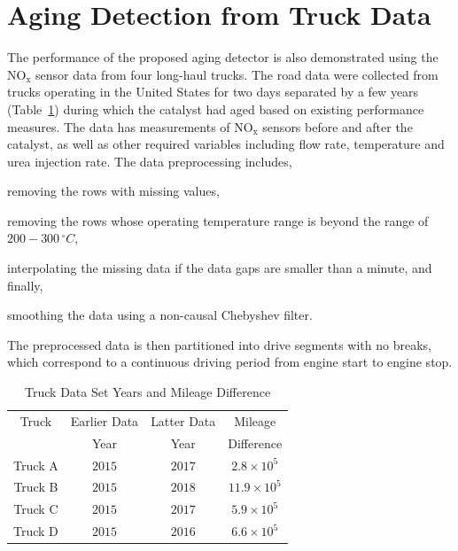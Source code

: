 \documentclass[subscriptcorrection,upint,varvw,barcolor=Goldenrod3,mathalfa=cal=euler,balance,hyphenate,french,pdf-a]{asmejour}
\newcommand{\nox}{\text{NO}_{\text{x}}}
\begin{document}
\section{Aging Detection from Truck Data}
The performance of the proposed aging detector is also demonstrated using the $\nox$ sensor data from four long-haul
trucks. The road data were collected from trucks operating in the United States for two days separated by a few years
(Table~\ref{tab::truck_data_summary}) during which the catalyst had aged based on existing performance measures. The
data has measurements of $\nox$ sensors before and after the catalyst, as well as other required variables
including flow rate, temperature and urea injection rate. The data preprocessing includes,
\begin{inparaenum}
        \item removing the rows with missing values,
        \item removing the rows whose operating temperature range is beyond the range of $200-300 \,^\circ C$,
        \item interpolating the missing data if the data gaps are smaller than a minute, and finally,
        \item smoothing the data using a non-causal Chebyshev filter.
\end{inparaenum}
The preprocessed data is then partitioned into drive segments with no breaks, which correspond to a continuous driving
period from engine start to engine stop.
\begin{table}[ht]
        \centering
        \caption{Truck Data Set Years and Mileage Difference}
        \label{tab::truck_data_summary}
        \begin{tabular}{c c c c}
                \hline \hline
                Truck   & Earlier Data & Latter Data & Mileage            \\
                        & Year         & Year        & Difference         \\ \hline \hline
                Truck A & $2015$       & $2017$      & $2.8 \times 10^5$  \\
                Truck B & $2015$       & $2018$      & $11.9 \times 10^5$ \\
                Truck C & $2015$       & $2017$      & $5.9 \times 10^5$  \\
                Truck D & $2015$       & $2016$      & $6.6 \times 10^5$  \\
                \hline \hline
        \end{tabular}
\end{table}
\end{document}
